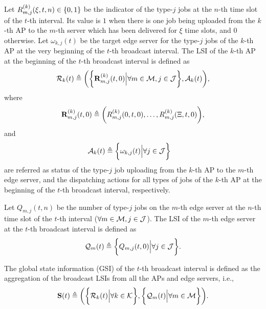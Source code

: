 \begin{definition}
    Let $R^{(k)}_{m,j}(\xi,t,n) \in \{0,1\}$ be the indicator of the type-$j$ jobs at the $n$-th time slot of the $t$-th interval.
    Its value is $1$ when there is one job being uploaded from the $k$-th AP to the $m$-th server which has been delivered for $\xi$ time slots, and $0$ otherwise.
    Let $\omega_{k,j}(t)$ be the target edge server for the type-$j$ jobs of the $k$-th AP at the very beginning of the $t$-th broadcast interval.
    The LSI of the $k$-th AP at the beginning of the $t$-th broadcast interval is defined as
    \begin{align}
        \mathcal{R}_{k}(t) \triangleq
        \bigg(
            \bigg\{\mathbf{R}^{(k)}_{m,j}(t,0) \Big| \forall m\in\mathcal{M},j\in\mathcal{J}\bigg\},
            \mathcal{A}_{k}(t)
        \bigg),
    \end{align}
    where
    \begin{align}
        \mathbf{R}^{(k)}_{m,j}(t,0) \triangleq \bigg(
            R^{(k)}_{m,j}(0,t,0), \dots, R^{(k)}_{m,j}(\Xi,t,0)
        \bigg),
    \end{align}
    and
    \begin{align}
        \mathcal{A}_{k}(t) &\triangleq \bigg\{\omega_{k,j}(t) \Big| \forall j\in\mathcal{J}\bigg\}
    \end{align}
    are referred as status of the type-$j$ job uploading from the $k$-th AP to the $m$-th edge server, and the dispatching actions for all types of jobs of the $k$-th AP at the beginning of the $t$-th broadcast interval, respectively.
\end{definition}

\begin{definition}
    Let $Q_{m,j}({t,n})$ be the number of type-$j$ jobs on the $m$-th edge server at the $n$-th time slot of the $t$-th interval ($\forall m\in\mathcal{M}, j\in\mathcal{J}$).
    The LSI of the $m$-th edge server at the $t$-th broadcast interval is defined as
    \begin{align}
        \mathcal{Q}_{m}(t) \triangleq \bigg\{
            Q_{m,j}(t, 0) \Big| \forall j\in\mathcal{J}
        \bigg\}.
    \end{align}
\end{definition}

\begin{definition}
    The global state information (GSI) of the $t$-th broadcast interval is defined as the aggregation of the broadcast LSIs from all the APs and edge servers, i.e.,
    \begin{align}
        \mathbf{S}(t) \triangleq
            \bigg(
                \bigg\{\mathcal{R}_{k}(t) \Big| \forall k\in\mathcal{K}\bigg\},
                \bigg\{\mathcal{Q}_{m}(t) \Big| \forall m\in\mathcal{M}\bigg\}
            \bigg).
    \end{align}
\end{definition}

